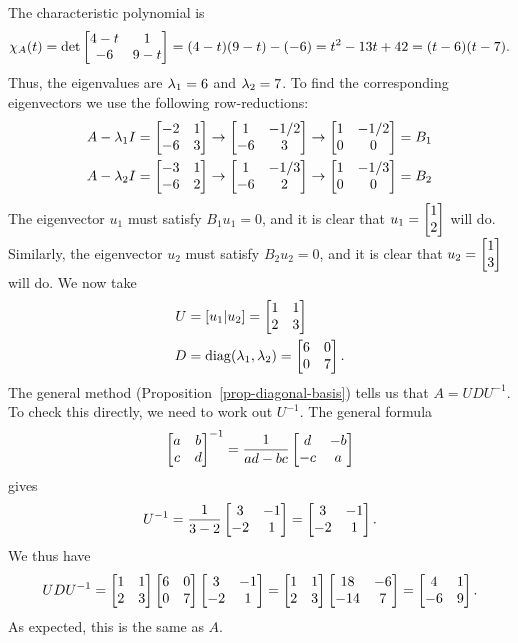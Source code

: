 \documentclass[a4paper]{amsart}
\renewenvironment{solution}{\SolutionInline}{\endSolutionInline}
\begin{document}
\begin{solution}
 The characteristic polynomial is
 \[ \chi_A(t)
      = \det\left[\begin{matrix} 4-t & 1 \\ -6 & 9-t \end{matrix}\right] 
      = (4-t)(9-t) - (-6) = t^2 -13t +42 = (t-6)(t-7).
 \]
 Thus, the eigenvalues are $\lambda_1=6$ and $\lambda_2=7$.  To find the
 corresponding eigenvectors we use the following row-reductions:
 \begin{align*}
  A-\lambda_1I &= \left[\begin{matrix} -2&1 \\ -6&3 \end{matrix}\right] 
            \to \left[\begin{matrix} 1&-1/2 \\ -6&3 \end{matrix}\right] 
            \to \left[\begin{matrix} 1&-1/2 \\ 0&0 \end{matrix}\right] 
            = B_1 \\
  A-\lambda_2I &= \left[\begin{matrix} -3&1 \\ -6&2 \end{matrix}\right] 
            \to \left[\begin{matrix} 1&-1/3 \\ -6&2 \end{matrix}\right] 
            \to \left[\begin{matrix} 1&-1/3 \\ 0&0 \end{matrix}\right] 
            = B_2
 \end{align*}
 The eigenvector $u_1$ must satisfy $B_1u_1=0$, and it is clear that
 $u_1=\left[\begin{matrix} 1\\2\end{matrix}\right]$ will do.   Similarly, the eigenvector $u_2$ must
 satisfy $B_2u_2=0$, and it is clear that $u_2=\left[\begin{matrix} 1\\3\end{matrix}\right]$ will do.
 We now take
 \begin{align*}
  U &= [u_1|u_2] = \left[\begin{matrix} 1 & 1 \\ 2 & 3 \end{matrix}\right] \\
  D &= \operatorname{diag}(\lambda_1,\lambda_2) = \left[\begin{matrix} 6 & 0 \\ 0 & 7 \end{matrix}\right].
 \end{align*}
 The general method (Proposition~\ref{prop-diagonal-basis}) tells us
 that $A=UDU^{-1}$.  To check this directly, we need to work out
 $U^{-1}$.  The general formula
 \[ \left[\begin{matrix} a&b\\ c&d\end{matrix}\right]^{-1} = \frac{1}{ad-bc}\left[\begin{matrix} d&-b \\-c&a\end{matrix}\right] \]
 gives 
 \[ U^{-1}=\frac{1}{3-2}\left[\begin{matrix} 3&-1\\-2&1\end{matrix}\right] = \left[\begin{matrix} 3&-1\\-2&1\end{matrix}\right]. \]
 We thus have
 \[ UDU^{-1} = 
     \left[\begin{matrix} 1 & 1 \\ 2 & 3 \end{matrix}\right]
     \left[\begin{matrix} 6 & 0 \\ 0 & 7 \end{matrix}\right]
     \left[\begin{matrix} 3 & -1\\ -2 & 1 \end{matrix}\right] =
     \left[\begin{matrix} 1 & 1 \\ 2 & 3 \end{matrix}\right]
     \left[\begin{matrix} 18 & -6 \\ -14 & 7 \end{matrix}\right] =
     \left[\begin{matrix} 4 & 1 \\ -6 & 9 \end{matrix}\right].
 \]
 As expected, this is the same as $A$.
\end{solution}
\end{document}
